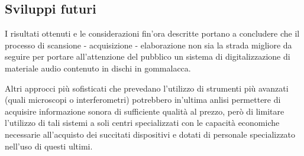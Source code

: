 \subsection{Sviluppi futuri}
I risultati ottenuti e le considerazioni fin'ora descritte portano a concludere che il processo di scansione - acquisizione - elaborazione non sia la strada migliore da seguire per portare all'attenzione del pubblico un sistema di digitalizzazione di materiale audio contenuto in dischi in gommalacca.

Altri approcci pi\`u sofisticati che prevedano l'utilizzo di strumenti pi\`u avanzati (quali microscopi o interferometri) potrebbero in'ultima anlisi permettere di acquisire informazione sonora di sufficiente qualit\`a al prezzo, per\`o di limitare l'utilizzo di tali sistemi a soli centri specializzati con le capacit\`a economiche necessarie all'acquisto dei succitati dispositivi e dotati di personale specializzato nell'uso di questi ultimi.